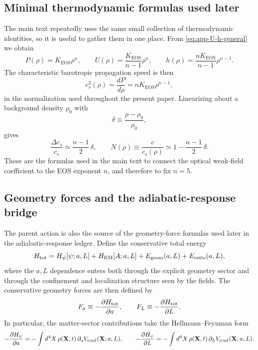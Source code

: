 \documentclass[11pt]{article}
\newcommand{\KEOS}{K_{\mathrm{EOS}}}
\begin{document}
\subsection{Minimal thermodynamic formulas used later}
\label{app:variational-thermo}

The main text repeatedly uses the same small collection of thermodynamic identities, so it
is useful to gather them in one place. From \eqref{eq:app-U-h-general} we obtain
\begin{equation}
P(\rho)=\KEOS \rho^n,
\qquad
U(\rho)=\frac{\KEOS}{n-1}\rho^n,
\qquad
h(\rho)=\frac{n\KEOS}{n-1}\rho^{n-1}.
\label{eq:app-thermo-triple}
\end{equation}
The characteristic barotropic propagation speed is then
\begin{equation}
c_s^2(\rho)=\frac{dP}{d\rho}=n\KEOS \rho^{n-1},
\label{eq:app-cs2}
\end{equation}
in the normalization used throughout the present paper. Linearizing about a background
density \(\rho_0\) with
\begin{equation}
\delta \equiv \frac{\rho-\rho_0}{\rho_0},
\label{eq:app-delta}
\end{equation}
gives
\begin{equation}
\frac{\Delta c_s}{c_s}
\simeq
\frac{n-1}{2}\,\delta,
\qquad
N(\rho)\equiv \frac{c}{c_s(\rho)}
\simeq
1-\frac{n-1}{2}\,\delta.
\label{eq:app-linearized-index}
\end{equation}
These are the formulas used in the main text to connect the optical weak-field coefficient
to the EOS exponent \(n\), and therefore to fix \(n=5\).

\subsection{Geometry forces and the adiabatic-response bridge}
\label{app:variational-geometry}

The parent action is also the source of the geometry-force formulas used later in the
adiabatic-response ledger. Define the conservative total energy
\begin{equation}
H_{\rm tot}
=
H_\psi[\psi;a,L]
+
H_{\rm EM}[A;a,L]
+
E_{\rm geom}(a,L)
+
E_{\rm ratio}(a,L),
\label{eq:app-Htot}
\end{equation}
where the \(a,L\) dependence enters both through the explicit geometry sector and through
the confinement and localization structure seen by the fields. The conservative geometry
forces are then defined by
\begin{equation}
F_a \equiv -\frac{\partial H_{\rm tot}}{\partial a},
\qquad
F_L \equiv -\frac{\partial H_{\rm tot}}{\partial L}.
\label{eq:app-FaFL}
\end{equation}
In particular, the matter-sector contributions take the Hellmann--Feynman form
\begin{equation}
-\frac{\partial H_\psi}{\partial a}
=
-\int d^4X\, \rho(\mathbf X,t)\,\partial_a V_{\rm conf}(\mathbf X;a,L),
\qquad
-\frac{\partial H_\psi}{\partial L}
=
-\int d^4X\, \rho(\mathbf X,t)\,\partial_L V_{\rm conf}(\mathbf X;a,L).
\label{eq:app-HF-matter}
\end{equation}
\end{document}
